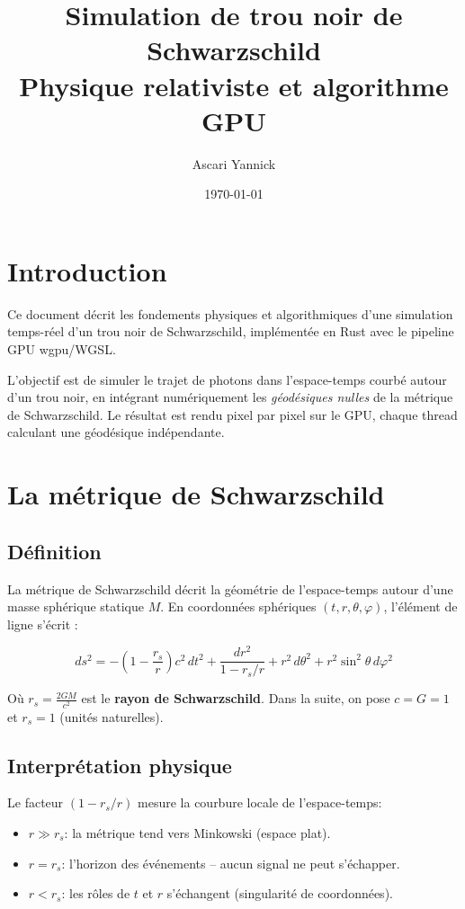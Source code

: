 \documentclass[12pt, a4paper]{article}
\title{
    \textbf{Simulation de trou noir de Schwarzschild} \\
    \large Physique relativiste et algorithme GPU
}
\author{Ascari Yannick}
\date{\today}
\begin{document}
\maketitle
\tableofcontents

\section{Introduction}

Ce document décrit les fondements physiques et algorithmiques d'une simulation
temps-réel d'un trou noir de Schwarzschild, implémentée en Rust avec le pipeline
GPU wgpu/WGSL.

L'objectif est de simuler le trajet de photons dans l'espace-temps courbé autour
d'un trou noir, en intégrant numériquement les \emph{géodésiques nulles} de la
métrique de Schwarzschild. Le résultat est rendu pixel par pixel sur le GPU, chaque
thread calculant une géodésique indépendante.

\section{La métrique de Schwarzschild}

\subsection{Définition}

La métrique de Schwarzschild décrit la géométrie de l'espace-temps autour d'une masse
sphérique statique $M$. En coordonnées sphériques $(t, r, \theta, \varphi)$, l'élément de ligne s'écrit :

\begin{equation}
    ds^2 = -\left(1 - \frac{r_s}{r}\right)c^2\,dt^2
         + \frac{dr^2}{1 - r_s/r}
         + r^2\,d\theta^2
         + r^2\sin^2\theta\,d\varphi^2
\end{equation}

Où $r_s = \frac{2GM}{c^2}$ est le \textbf{rayon de Schwarzschild}.
Dans la suite, on pose $c = G = 1$ et $r_s = 1$ (unités naturelles).

\subsection{Interprétation physique}

Le facteur $\left(1 - r_s/r\right)$ mesure la courbure locale de l'espace-temps:

\begin{itemize}
    \item $r \gg r_s$: la métrique tend vers Minkowski (espace plat).
    \item $r = r_s$: l'horizon des événements \--- aucun signal ne peut s'échapper.
    \item $r < r_s$: les rôles de $t$ et $r$ s'échangent (singularité de coordonnées). 
\end{itemize}
\end{document}
